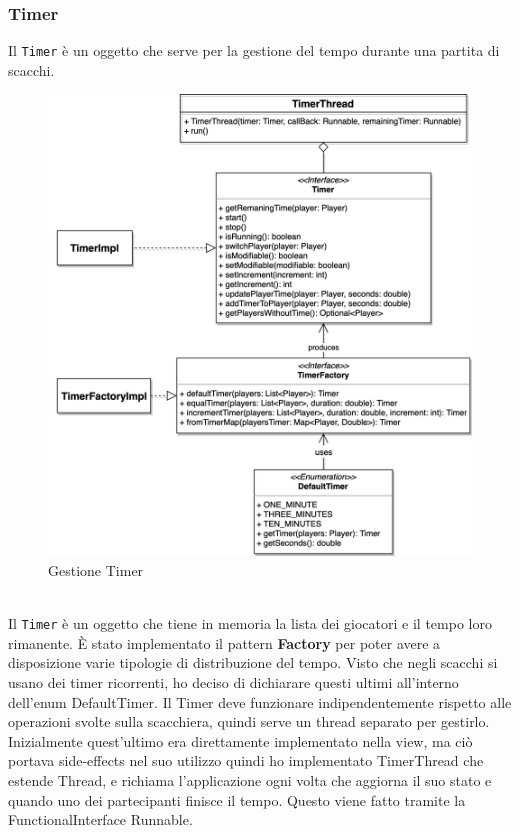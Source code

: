 \documentclass[a4paper,12pt]{report}
\begin{document}
\subsubsection*{Timer}
Il \texttt{Timer} è un oggetto che serve per la gestione del tempo durante una partita di scacchi.
\begin{figure}[H]
    \begin{center}
        \centering
        \includegraphics[scale=0.75]{img/Tommaso/timer.png}
    \end{center}
    \caption{Gestione Timer}
    \label{img:timer}
\end{figure}
\
\\
Il \texttt{Timer} è un oggetto che tiene in memoria la lista dei giocatori e il tempo loro rimanente.
È stato implementato il pattern \textbf{Factory} per poter avere a disposizione varie tipologie di distribuzione del tempo.
Visto che negli scacchi si usano dei timer ricorrenti, ho deciso di dichiarare questi ultimi all'interno dell'enum DefaultTimer.
Il Timer deve funzionare indipendentemente rispetto alle operazioni svolte sulla scacchiera, quindi serve un thread separato per gestirlo. Inizialmente quest'ultimo era direttamente implementato nella view, ma ciò portava side-effects nel suo utilizzo quindi ho implementato TimerThread che estende Thread, e richiama l'applicazione ogni volta che aggiorna il suo stato e quando uno dei partecipanti finisce il tempo. Questo viene fatto tramite la FunctionalInterface Runnable.
\end{document}
